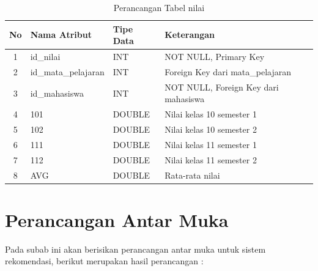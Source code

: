 \begin{enumerate}
        \begin{table}[H]
            \centering
            \begin{tabular}{|c|p{4cm}|p{4cm}|p{4cm}|}
                \hline
                No & Nama Atribut & Tipe Data & Keterangan \\
                \hline
                1 & id\_nilai & INT & NOT NULL, Primary Key \\
                \hline
                2 & id\_mata\_pelajaran & INT & Foreign Key dari mata\_pelajaran \\
                \hline
                3 & id\_mahasiswa & INT & NOT NULL, Foreign Key dari mahasiswa \\
                \hline
                4 & 101 & DOUBLE & Nilai kelas 10 semester 1 \\
                \hline
                5 & 102 & DOUBLE & Nilai kelas 10 semester 2 \\
                \hline
                6 & 111 & DOUBLE & Nilai kelas 11 semester 1 \\
                \hline
                7 & 112 & DOUBLE & Nilai kelas 11 semester 2 \\
                \hline
                8 & AVG & DOUBLE & Rata-rata nilai \\
                \hline
            \end{tabular}
            \caption{Perancangan Tabel nilai}
            \label{tab:perancangan tabel nilai}
        \end{table}
\end{enumerate}

\section{Perancangan Antar Muka}
\label{sec:perancangan antar muka}

Pada subab ini akan berisikan perancangan antar muka untuk sistem rekomendasi, berikut merupakan hasil perancangan :

